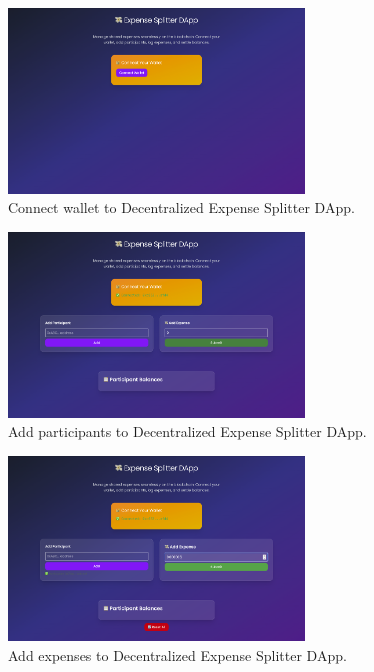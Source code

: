 \documentclass[12pt, a4paper]{article}
\begin{document}
\begin{figure}[h]
    \centering
    \includegraphics[width=0.7\textwidth]{connect-wallet.png}
    \caption{Connect wallet to Decentralized Expense Splitter DApp.}
    \label{fig:expense_splitter_architecture}
\end{figure}
\begin{figure}[h]
    \centering
    \includegraphics[width=0.7\textwidth]{add_participant.png}
    \caption{Add participants to Decentralized Expense Splitter DApp.}
    \label{fig:add_participants}
\end{figure}
\begin{figure}[h]
    \centering
    \includegraphics[width=0.7\textwidth]{add_expense.png}
    \caption{Add expenses to Decentralized Expense Splitter DApp.}
    \label{fig:add_expense}
\end{figure}
\end{document}
